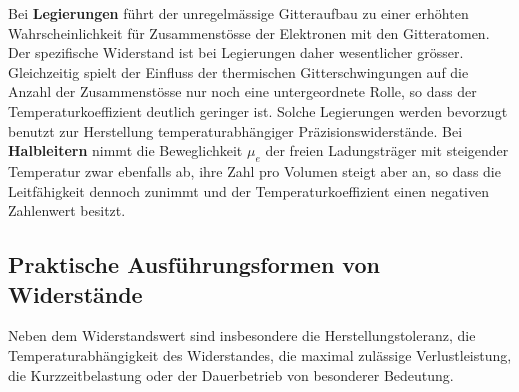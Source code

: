 \newline\newline
Bei \textbf{Legierungen} führt der unregelmässige Gitteraufbau zu einer erhöhten Wahrscheinlichkeit für Zusammenstösse der Elektronen mit den Gitteratomen. Der spezifische Widerstand ist bei Legierungen daher wesentlicher grösser. Gleichzeitig spielt der Einfluss der thermischen Gitterschwingungen auf die Anzahl der Zusammenstösse nur noch eine untergeordnete Rolle, so dass der Temperaturkoeffizient deutlich geringer ist. Solche Legierungen werden bevorzugt benutzt zur Herstellung temperaturabhängiger Präzisionswiderstände.
\newline\newline
Bei \textbf{Halbleitern} nimmt die Beweglichkeit $\mu_e$ der freien Ladungsträger mit steigender Temperatur zwar ebenfalls ab, ihre Zahl pro Volumen steigt aber an, so dass die Leitfähigkeit dennoch zunimmt und der Temperaturkoeffizient einen negativen Zahlenwert besitzt.
\subsection{Praktische Ausführungsformen von Widerstände}
Neben dem Widerstandswert sind insbesondere die Herstellungstoleranz, die Temperaturabhängigkeit des Widerstandes, die maximal zulässige Verlustleistung, die Kurzzeitbelastung oder der Dauerbetrieb von besonderer Bedeutung.
